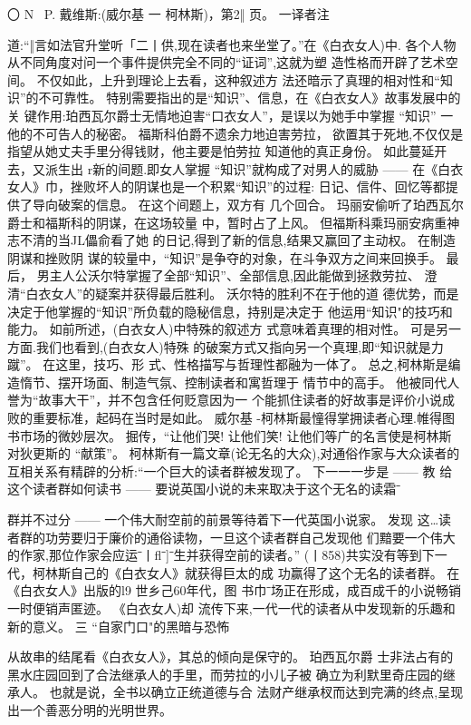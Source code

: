 \documentclass[a4paper]{article}
\begin{document}
〇 N~ P. 戴维斯:(威尔基 一 柯林斯)，第2‖ 页。 一译者注

道:“‖言如法官升堂听「二丨供,现在读者也来坐堂了。”在《白衣女人)中.
各个人物从不同角度对问一个事件提供完全不同的“证词”,这就为塑
造性格而开辟了艺术空间。 不仅如此，上升到理论上去看，这种叙述方
法还暗示了真理的相对性和“知识”的不可靠性。
特别需要指出的是“知识”、信息，在《白衣女人》故事发展中的关
键作用:珀西瓦尔爵士无情地迫害“口衣女人”，是误以为她手中掌握
“知识” 一他的不可告人的秘密。 福斯科伯爵不遗余力地迫害劳拉，
欲置其于死地,不仅仅是指望从她丈夫手里分得钱财，他主要是怕劳拉
知道他的真正身份。 如此蔓延开去，又派生出 r新的间题.即女人掌握
“知识”就构成了对男人的威胁 ------
在《白衣女人》巾，挫败坏人的阴谋也是一个积累“知识”的过程:
日记、信件、回忆等都提供了导向破案的信息。 在这个间题上，双方有
几个回合。 玛丽安偷听了珀西瓦尔爵士和福斯科的阴谋，在这场较量
中，暂时占了上风。 但福斯科乘玛丽安病重神志不清的当JL儡俞看了她
的日记,得到了新的信息,结果又赢回了主动权。 在制造阴谋和挫败阴
谋的较量中，“知识”是争夺的对象，在斗争双方之间来回换手。 最后，
男主人公沃尔特掌握了全部“知识”、全部信息,因此能做到拯救劳拉、
澄清“白衣女人”的疑案并获得最后胜利。 沃尔特的胜利不在于他的道
德优势，而是决定于他掌握的“知识”所负载的隐秘信息，持别是决定于
他运用“知识"的技巧和能力。 如前所述，(白衣女人)中特殊的叙述方
式意味着真理的相对性。 可是另一方面.我们也看到,(白衣女人)特殊
的破案方式又指向另一个真理,即“知识就是力蹴”。 在这里，技巧、形
式、性格描写与哲理性都融为一体了。
总之,柯林斯是编造惰节、摆开场面、制造气氛、控制读者和寓哲理于
情节中的高手。 他被同代人誉为“故事大干”，并不包含任何贬意因为一
个能抓住读者的好故事是评价小说成败的重要标准，起码在当时是如此。
威尔基 -柯林斯最憧得掌拥读者心理.帷得图书市场的微妙层次。
掘传，“让他们哭! 让他们笑! 让他们等广的名言使是柯林斯对狄更斯的
“献策”。 柯林斯有一篇文章(论无名的大众),对通俗作家与大众读者的
互相关系有精辟的分析:“一个巨大的读者群被发现了。 下一一一步是 ------ 教
给这个读者群如何读书 ------ 要说英国小说的未来取决于这个无名的读霜ˉ

群并不过分 ------ 一个伟大耐空前的前景等待着下一代英国小说家。 发现
这…读者群的功劳要归于廉价的通俗读物，一旦这个读者群自己发现他
们黯要一个伟大的作家,那位作家会应运ˉ丨flˉ]ˉ生并获得空前的读者。”
(丨858)共实没有等到下一代，柯林斯自己的《白衣女人》就获得巨太的成
功赢得了这个无名的读者群。 在《白衣女人》出版的l9 世乡己60年代，图
书巾ˉ场正在形成，成百成千的小说畅销一时便销声匿迹。 《白衣女人)却
流传下来,一代一代的读者从中发现新的乐趣和新的意义。
三 “自家门口"的黑暗与恐怖

从故串的结尾看《白衣女人》，其总的倾向是保守的。 珀西瓦尔爵
士非法占有的黑水庄园回到了合法继承人的手里，而劳拉的小儿子被
确立为利默里奇庄园的继承人。 也就是说，全书以确立正统道德与合
法财产继承杈而达到完满的终点,呈现出一个善恶分明的光明世界。
\end{document}
